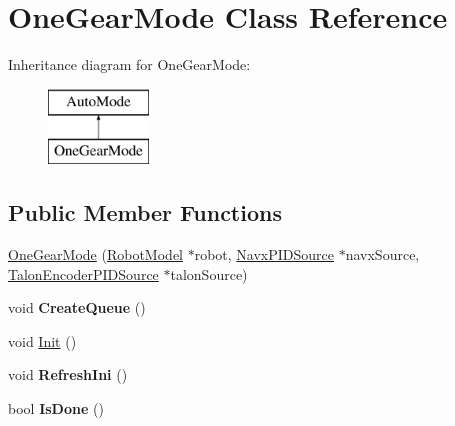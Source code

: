 \hypertarget{class_one_gear_mode}{}\section{One\+Gear\+Mode Class Reference}
\label{class_one_gear_mode}
Inheritance diagram for One\+Gear\+Mode\+:\begin{figure}[H]
\begin{center}
\leavevmode
\includegraphics[height=2.000000cm]{class_one_gear_mode}
\end{center}
\end{figure}
\subsection*{Public Member Functions}
\begin{DoxyCompactItemize}
\item 
\hyperlink{class_one_gear_mode_a738b0127f542fb89c5a5976e534b6ef9}{One\+Gear\+Mode} (\hyperlink{class_robot_model}{Robot\+Model} $\ast$robot, \hyperlink{class_navx_p_i_d_source}{Navx\+P\+I\+D\+Source} $\ast$navx\+Source, \hyperlink{class_talon_encoder_p_i_d_source}{Talon\+Encoder\+P\+I\+D\+Source} $\ast$talon\+Source)
\item 
\mbox{\label{class_one_gear_mode_a496910af844fa979cd7d879831dbb609}} 
void {\bfseries Create\+Queue} ()
\item 
void \hyperlink{class_one_gear_mode_a6e4583155a7f2c96f19e937d1315bdf8}{Init} ()
\item 
\mbox{\label{class_one_gear_mode_a1aff75538d9985927fd0f10536b66aec}} 
void {\bfseries Refresh\+Ini} ()
\item 
\mbox{\label{class_one_gear_mode_abbb66b39f2525f4de3d8cc0096d685a0}} 
bool {\bfseries Is\+Done} ()
\end{DoxyCompactItemize}
